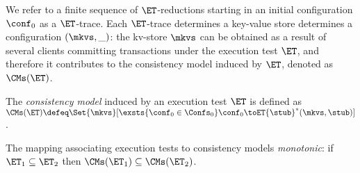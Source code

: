 We refer to a finite sequence of $\ET$-reductions starting in an initial configuration $\conf_{0}$ as a $\ET$-trace. 
Each $\ET$-trace determines a key-value store determines a configuration $(\mkvs, \_)$: the 
kv-store $\mkvs$ can be obtained as a result of several clients committing transactions under the 
execution test $\ET$, and therefore it contributes to the consistency model induced by $\ET$, 
denoted as $\CMs(\ET)$.
%
%

\begin{definition}
\label{def:cm}
The \emph{consistency model} induced by an execution test $\ET$ is defined as 
\(
\CMs(\ET) \defeq 
\Set{\mkvs}[ 
\exsts{\conf_0 \in \Confs_0}
\conf_0 \toET{\stub}^{*} (\mkvs, \stub)
]
\).
\end{definition}
The mapping associating execution tests to consistency models 
\emph{monotonic}: if $\ET_1 \subseteq \ET_2$ then $\CMs(\ET_1) \subseteq \CMs(\ET_2)$.
%

